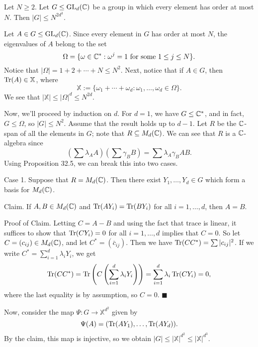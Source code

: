 \begin{lemma}{}
    Let $N \geq 2$. Let $G \leq \operatorname{GL}_d(\mathbb{C})$ be a group in which every 
    element has order at most $N$. Then $|G| \leq N^{2d^3}$. 
\end{lemma}
\begin{pf}
   Let $A \in G \leq \operatorname{GL}_d(\mathbb{C})$. Since every element in $G$ has order 
   at most $N$, the eigenvalues of $A$ belong to the set 
   \[ \Omega = \{\omega \in \mathbb{C}^* : \omega^j = 1 \text{ for some } 
   1 \leq j \leq N\}. \] 
   Notice that $|\Omega| = 1 + 2 + \cdots + N \leq N^2$. Next, notice that 
   if $A \in G$, then $\operatorname{Tr}(A) \in \mathbb{X}$, where 
   \[ \mathbb{X} := \{\omega_1 + \cdots + \omega_d : \omega_1, \dots, 
   \omega_d \in \Omega\}. \] 
   We see that $|\mathbb{X}| \leq |\Omega|^d \leq N^{2d}$. 

   Now, we'll proceed by induction on $d$. For $d = 1$, we have $G \leq 
   \mathbb{C}^*$, and in fact, $G \leq \Omega$, so $|G| \leq N^2$. Assume that the 
   result holds up to $d - 1$. Let $R$ be the $\mathbb{C}$-span of all the elements 
   in $G$; note that $R \subseteq M_d(\mathbb{C})$. We can see that $R$ is a 
   $\mathbb{C}$-algebra since 
   \[ \left( \sum \lambda_A A \right) \left( \sum \gamma_B B \right) = 
   \sum \lambda_A \gamma_B AB. \] 
   Using Proposition 32.5, we can break this into two cases. 

   {\sc Case 1.} Suppose that $R = M_d(\mathbb{C})$. Then there exist $Y_1, \dots, Y_d 
   \in G$ which form a basis for $M_d(\mathbb{C})$. 

   {\sc Claim.} If $A, B \in M_d(\mathbb{C})$ and $\operatorname{Tr}(AY_i) = \operatorname{Tr}(BY_i)$ for all 
   $i = 1, \dots, d$, then $A = B$.

   {\sc Proof of Claim.} Letting $C = A - B$ and using the fact that trace is 
   linear, it suffices to show that $\operatorname{Tr}(CY_i) = 0$ for all $i = 1, \dots, d$ 
   implies that $C = 0$. So let $C = (c_{ij}) \in M_d(\mathbb{C})$, and let 
   $C^* = (\bar{c}_{ij})$. Then we have $\operatorname{Tr}(CC^*) = \sum |c_{ij}|^2$. 
   If we write $C^* = \sum_{i=1}^d \lambda_i Y_i$, we get 
   \[ \operatorname{Tr}(CC^*) = \operatorname{Tr}\left( C \left(\sum_{i=1}^d \lambda_iY_i\right) \right) 
   = \sum_{i=1}^d \lambda_i \operatorname{Tr}(CY_i) = 0, \] 
   where the last equality is by assumption, so $C = 0$. \hfill $\blacksquare$ 

   Now, consider the map $\Psi : G \to \mathbb{X}^{d^2}$ given by 
   \[ \Psi(A) = (\operatorname{Tr}(AY_1), \dots, \operatorname{Tr}(AY_d)). \] 
   By the claim, this map is injective, so we obtain $|G| \leq |\mathbb{X}|^{d^2} 
   \leq |\mathbb{X}|^{d^3}$. 


\end{pf}
